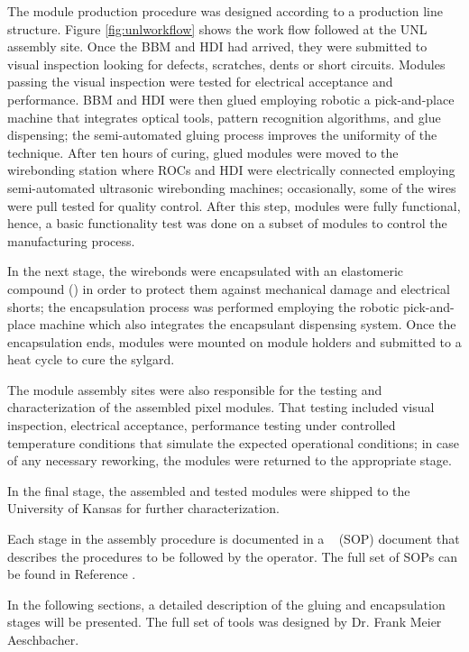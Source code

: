The module production procedure was designed according to a production line structure. Figure \ref{fig:unlworkflow} shows the work flow followed at the UNL assembly site. Once the BBM and HDI had arrived, they were submitted to visual inspection looking for defects, scratches, dents or short circuits. Modules passing the visual inspection were tested for electrical acceptance and performance. BBM and HDI were then glued employing robotic a pick-and-place machine that integrates optical tools, pattern recognition algorithms, and glue dispensing; the semi-automated gluing process improves the uniformity of the technique. After ten hours of curing, glued modules were moved to the wirebonding station where ROCs and HDI were electrically connected employing semi-automated ultrasonic wirebonding machines; occasionally, some of the wires were pull tested for quality control. After this step, modules were fully functional, hence, a basic functionality test was done on a subset of modules to control the manufacturing process.    

In the next stage, the wirebonds were encapsulated with an elastomeric compound () in order to protect them against mechanical damage and electrical shorts; the encapsulation process was performed employing the robotic pick-and-place machine which also integrates the encapsulant dispensing system. Once the encapsulation ends, modules were mounted on module holders and submitted to a heat cycle to cure the sylgard.    

The module assembly sites were also responsible for the testing and characterization of the assembled pixel modules. That testing included visual inspection, electrical acceptance, performance testing under controlled temperature conditions that simulate the expected operational conditions; in case of any necessary reworking, the modules were returned to the appropriate stage.

In the final stage, the assembled and tested modules were shipped to the University of Kansas for further characterization.  

Each stage in the assembly procedure is documented in a ~ (SOP) document that describes the procedures to be followed by the operator. The full set of SOPs can be found in Reference \cite{unl_sop}.     

In the following sections, a detailed description of the gluing and encapsulation stages will be presented. The full set of tools was designed by Dr. Frank Meier Aeschbacher. 

